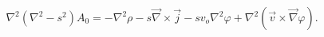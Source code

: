 \begin{equation}
\nabla^{2}(\nabla^{2}-s^{2})A_{0}=-\nabla^{2}\rho-s\overrightarrow{\nabla
}\times\overrightarrow{j}-sv_{o}\nabla^{2}\varphi+\nabla^{2}\left(
\overrightarrow{v}\times\overrightarrow{\nabla}\varphi\right)  .
\label{Ascalar2}%
\end{equation}

